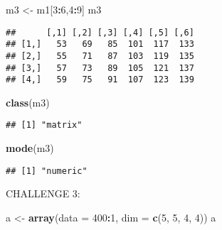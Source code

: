 \documentclass[]{article}
\newenvironment{Shaded}{\begin{snugshade}}{\end{snugshade}}
\newcommand{\KeywordTok}[1]{\textcolor[rgb]{0.13,0.29,0.53}{\textbf{#1}}}
\newcommand{\DataTypeTok}[1]{\textcolor[rgb]{0.13,0.29,0.53}{#1}}
\newcommand{\DecValTok}[1]{\textcolor[rgb]{0.00,0.00,0.81}{#1}}
\newcommand{\StringTok}[1]{\textcolor[rgb]{0.31,0.60,0.02}{#1}}
\newcommand{\OperatorTok}[1]{\textcolor[rgb]{0.81,0.36,0.00}{\textbf{#1}}}
\newcommand{\NormalTok}[1]{#1}
\begin{document}
\begin{Shaded}
\begin{Highlighting}[]
\NormalTok{m3 <-}\StringTok{ }\NormalTok{m1[}\DecValTok{3}\OperatorTok{:}\DecValTok{6}\NormalTok{,}\DecValTok{4}\OperatorTok{:}\DecValTok{9}\NormalTok{]}
\NormalTok{m3}
\end{Highlighting}
\end{Shaded}

\begin{verbatim}
##      [,1] [,2] [,3] [,4] [,5] [,6]
## [1,]   53   69   85  101  117  133
## [2,]   55   71   87  103  119  135
## [3,]   57   73   89  105  121  137
## [4,]   59   75   91  107  123  139
\end{verbatim}

\begin{Shaded}
\begin{Highlighting}[]
\KeywordTok{class}\NormalTok{(m3)}
\end{Highlighting}
\end{Shaded}

\begin{verbatim}
## [1] "matrix"
\end{verbatim}

\begin{Shaded}
\begin{Highlighting}[]
\KeywordTok{mode}\NormalTok{(m3)}
\end{Highlighting}
\end{Shaded}

\begin{verbatim}
## [1] "numeric"
\end{verbatim}

CHALLENGE 3:

\begin{Shaded}
\begin{Highlighting}[]
\NormalTok{a <-}\StringTok{ }\KeywordTok{array}\NormalTok{(}\DataTypeTok{data =} \DecValTok{400}\OperatorTok{:}\DecValTok{1}\NormalTok{, }\DataTypeTok{dim =} \KeywordTok{c}\NormalTok{(}\DecValTok{5}\NormalTok{, }\DecValTok{5}\NormalTok{, }\DecValTok{4}\NormalTok{, }\DecValTok{4}\NormalTok{))}
\NormalTok{a}
\end{Highlighting}
\end{Shaded}
\end{document}
